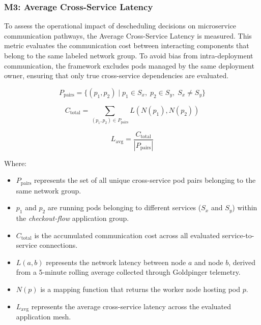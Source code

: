 \subsubsection{M3: Average Cross-Service Latency}
\label{subsubsec:netaware4_evaluationmetrics3}
To assess the operational impact of descheduling decisions on microservice communication pathways, the Average Cross-Service Latency is measured. This metric evaluates the communication cost between interacting components that belong to the same labeled network group. To avoid bias from intra-deployment communication, the framework excludes pods managed by the same deployment owner, ensuring that only true cross-service dependencies are evaluated.

\[
P_{\text{pairs}}
=
\{
(p_1, p_2)
\mid
p_1 \in S_x,\;
p_2 \in S_y,\;
S_x \neq S_y
\}
\]

\[
C_{\text{total}}
=
\sum_{(p_1, p_2) \in P_{\text{pairs}}}
L\left(
N(p_1),
N(p_2)
\right)
\]

\[
L_{\text{avg}}
=
\frac{C_{\text{total}}}
{|P_{\text{pairs}}|}
\]

Where:

\begin{itemize}
    \item \(P_{\text{pairs}}\) represents the set of all unique cross-service pod pairs belonging to the same network group.

    \item \(p_1\) and \(p_2\) are running pods belonging to different services (\(S_x\) and \(S_y\)) within the \textit{checkout-flow} application group.

    \item \(C_{\text{total}}\) is the accumulated communication cost across all evaluated service-to-service connections.

    \item \(L(a,b)\) represents the network latency between node \(a\) and node \(b\), derived from a 5-minute rolling average collected through Goldpinger telemetry.

    \item \(N(p)\) is a mapping function that returns the worker node hosting pod \(p\).

    \item \(L_{\text{avg}}\) represents the average cross-service latency across the evaluated application mesh.
\end{itemize}

